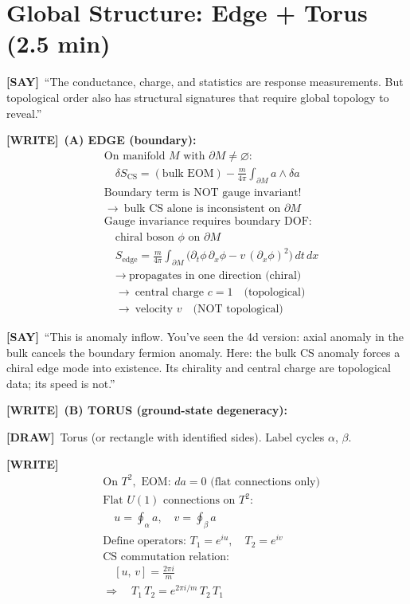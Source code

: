 \documentclass[11pt]{article}
\newcommand{\WRITE}{\textcolor{writecol}{\textbf{[WRITE]}}}
\newcommand{\SAY}{\textcolor{saycol}{\textbf{[SAY]}}}
\newcommand{\DRAW}{\textcolor{drawcol}{\textbf{[DRAW]}}}
\begin{document}
\section{Global Structure: Edge + Torus (2.5 min)}

\SAY\ ``The conductance, charge, and statistics are response measurements. But topological order also has structural signatures that require global topology to reveal.''

\WRITE\ \textbf{(A) EDGE (boundary):}
\begin{align*}
&\text{On manifold }M\text{ with }\partial M\neq\varnothing:\\[4pt]
&\quad\delta S_{\mathrm{CS}} = (\text{bulk EOM}) - \frac{m}{4\pi}\int_{\partial M}\!a\wedge\delta a\\[6pt]
&\text{Boundary term is NOT gauge invariant!}\\
&\to\ \text{bulk CS alone is inconsistent on }\partial M\\[6pt]
&\text{Gauge invariance requires boundary DOF:}\\
&\quad\text{chiral boson }\phi\text{ on }\partial M\\[4pt]
&\quad S_{\mathrm{edge}} = \frac{m}{4\pi}\int_{\partial M}\!\bigl(\partial_t\phi\,\partial_x\phi - v\,(\partial_x\phi)^2\bigr)\,dt\,dx\\[6pt]
&\quad\to\ \text{propagates in one direction (chiral)}\\
&\quad\to\ \text{central charge }c = 1\quad\text{(topological)}\\
&\quad\to\ \text{velocity }v\quad\text{(NOT topological)}
\end{align*}

\SAY\ ``This is anomaly inflow. You've seen the 4d version: axial anomaly in the bulk cancels the boundary fermion anomaly. Here: the bulk CS anomaly forces a chiral edge mode into existence. Its chirality and central charge are topological data; its speed is not.''

\WRITE\ \textbf{(B) TORUS (ground-state degeneracy):}

\DRAW\ Torus (or rectangle with identified sides). Label cycles $\alpha$, $\beta$.

\WRITE
\begin{align*}
&\text{On }T^2,\text{ EOM: }da=0\text{ (flat connections only)}\\[4pt]
&\text{Flat }U(1)\text{ connections on }T^2:\\
&\quad u = \oint_\alpha\! a,\quad v = \oint_\beta\! a\\[6pt]
&\text{Define operators: } T_1 = e^{iu},\quad T_2 = e^{iv}\\[6pt]
&\text{CS commutation relation:}\\
&\quad [u,\,v] = \frac{2\pi i}{m}\\[6pt]
&\Longrightarrow\quad T_1\,T_2 = e^{2\pi i/m}\,T_2\,T_1
\end{align*}
\end{document}
